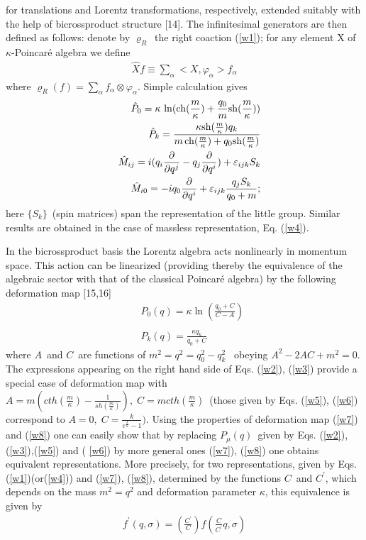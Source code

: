 \documentclass[a4paper,a4paper]{article}
\begin{document}
for translations and Lorentz transformations, respectively,
extended suitably with the help of bicrossproduct structure [14].
The infinitesimal generators are then defined as follows: denote
by $\varrho_{R}$\ the right coaction (\ref{w1}); for any element
X of $\kappa$-Poincar\'{e} algebra we define
\begin{eqnarray}\label{wz9}
\hat{X}f\equiv \sum_{\alpha}<X,\varphi_{\alpha}>
f_{\alpha} \label{w88}
\end{eqnarray}
where $\varrho_{R}(f)=\sum_{\alpha}
f_{\alpha} \otimes \varphi_{\alpha}$.
 Simple calculation
gives
\begin{eqnarray}\label{wz10}
&&\hat{P}_{0}= \kappa \,
 \ln({\rm ch}(\frac{m}{\kappa})+\frac{q_{0}}{m}
 {\rm sh}(\frac{m}{\kappa})) \nonumber \\
&&\hat{P}_{k}= \frac{\kappa
{\rm sh}(\frac{m}{\kappa})q_{k}}{m\, {\rm ch}(\frac{m}
{\kappa})+q_{0}{\rm sh}(\frac{m}{\kappa})} \nonumber \\
&&\hat{M}_{ij}=i(q_{i}\frac{\partial}
{\partial q^{j}}-q_{j}\frac{\partial}{\partial q^{i}})+
\varepsilon_{ijk}S_{k} \label{w109}\\
&&\hat{M}_{i0}=-iq_{0}\frac{\partial }
{\partial q^{i}}+\varepsilon_{ijk}
\frac{q_{j}S_{k}}{q_{0}+m};\nonumber
\end{eqnarray}
here $\{ S_{k} \}$\ (spin matrices)
 span the representation of the little group. Similar results
are obtained in the case of massless representation, Eq. (\ref{w4}).

 In the bicrossproduct  basis the
Lorentz algebra acts nonlinearly in momentum space. This action
can be linearized (providing thereby the equivalence of the
algebraic sector with that of the classical Poincar\'{e} algebra)
by the following deformation map [15,16]
\begin{eqnarray}\label{wz11}
&&P_{0}(q)=\kappa \ln(\frac{q_{0}+C}{C-A})  \label{w7} \\  %
\nonumber \\
&&P_{k}(q)= \frac{\kappa q_{k}}{q_{0}+C}  \label{w8}       %
\end{eqnarray}
where $A$\ and $C$\
are functions of $m^{2}=q^{2} = q^{2}_{0} - q^{2}_{k}$
 \ obeying $%
A^{2}-2AC+m^{2}=0$.
The expressions appearing on the right hand side
of
Eqs. (\ref{w2}), (\ref{w3}) provide a special case  of deformation
map with $%
A=m(cth (\frac{m}{\kappa})-\frac{1}{sh(\frac{m}{\kappa})}),\;
C=mcth(\frac{m%
}{\kappa})$\ (those given by Eqs. (\ref{w5}), (\ref{w6}) correspond
to $%
A=0,\;C=\frac{k}{e^{\frac{k}{\kappa}}-1})$.  Using the properties of
deformation map (\ref{w7})
 and (\ref{w8}) one can easily show that by
replacing $P_{\mu}(q)$\ given by Eqs.
(\ref{w2}),(\ref{w3}),(\ref{w5}) and (%
\ref{w6})  by more general ones (\ref{w7}), (\ref{w8}) one obtains
equivalent representations. More precisely, for two
representations, given by Eqs. (\ref{w1})(or(\ref{w4})) and
(\ref{w7}), (\ref{w8}),   determined by the functions $C$\ and
$C^{\prime}$, which depends on  the mass  $m^{2} = q^{2}$  and
deformation parameter $\kappa$,  this equivalence is given by
\begin{eqnarray}\label{wz12}
f^{\prime}(q,\sigma)=(\frac{C^{\prime}}{C})f(\frac{C}{C^{\prime}}q,
\sigma)
\end{eqnarray}
\end{document}
